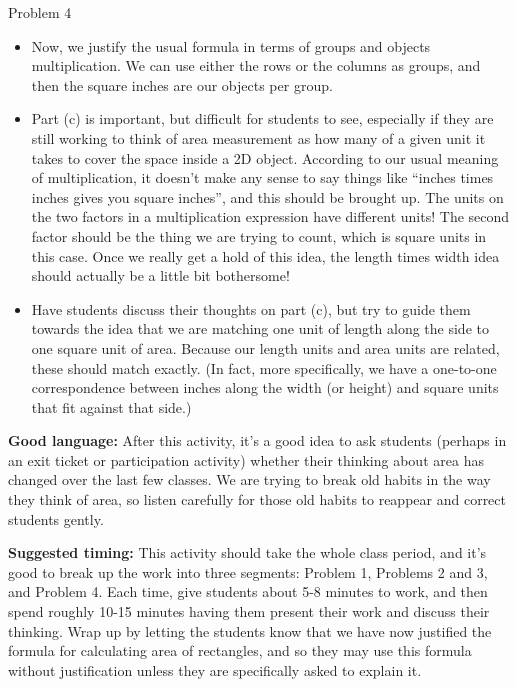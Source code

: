\documentclass[nooutcomes,handout,noauthor]{ximera}
\begin{document}
\begin{instructorNotes}
Problem 4
\begin{itemize}
	\item Now, we justify the usual formula in terms of groups and objects multiplication. We can use either the rows or the columns as groups, and then the square inches are our objects per group. 
	\item Part (c) is important, but difficult for students to see, especially if they are still working to think of area measurement as how many of a given unit it takes to cover the space inside a 2D object.  According to our usual meaning of multiplication, it doesn't make any sense to say things like ``inches times inches gives you square inches'', and this should be brought up. The units on the two factors in a multiplication expression have different units! The second factor should be the thing we are trying to count, which is square units in this case. Once we really get a hold of this idea, the length times width idea should actually be a little bit bothersome! 
	\item Have students discuss their thoughts on part (c), but try to guide them towards the idea that we are matching one unit of length along the side to one square unit of area. Because our length units and area units are related, these should match exactly. (In fact, more specifically, we have a one-to-one correspondence between inches along the width (or height) and square units that fit against that side.) 
\end{itemize}


{\bf Good language:} After this activity, it's a good idea to ask students (perhaps in an exit ticket or participation activity) whether their thinking about area has changed over the last few classes. We are trying to break old habits in the way they think of area, so listen carefully for those old habits to reappear and correct students gently.

{\bf Suggested timing:} This activity should take the whole class period, and it's good to break up the work into three segments: Problem 1, Problems 2 and 3, and Problem 4. Each time, give students about 5-8 minutes to work, and then spend roughly 10-15 minutes having them present their work and discuss their thinking. Wrap up by letting the students know that we have now justified the formula for calculating area of rectangles, and so they may use this formula without justification unless they are specifically asked to explain it.



\end{instructorNotes}
\end{document}
